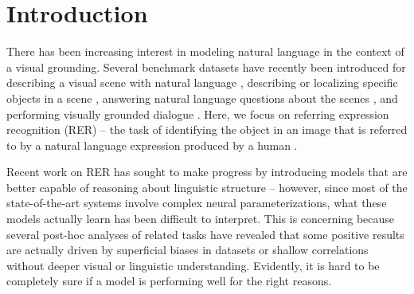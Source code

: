 \documentclass[11pt,a4paper]{article}
\begin{document}
\section{Introduction} 
\label{sec:introduction}
There has been increasing interest in modeling natural language in the context of a visual grounding. Several benchmark datasets have recently been introduced for describing a visual scene with natural language \cite{chen2015microsoft}, describing or localizing specific objects in a scene \cite{KazemzadehOrdonezMattenBergEMNLP14,mao2016generation}, answering natural language questions about the scenes \cite{antol2015vqa}, and performing visually grounded dialogue \cite{das2016visual}. Here, we focus on referring expression recognition (RER) -- the task of identifying the object in an image that is referred to by a natural language expression produced by a human \cite{KazemzadehOrdonezMattenBergEMNLP14,mao2016generation,hu2016natural,rohrbach2016grounding,yu2016modeling,nagaraja16refexp,hu2017modeling,cirik2018using}.

Recent work on RER has sought to make progress by introducing models that are better capable of reasoning about linguistic structure \cite{hu2017modeling,nagaraja16refexp} -- however, since most of the state-of-the-art systems involve complex neural parameterizations, what these models actually learn has been difficult to interpret.
This is concerning because several post-hoc analyses of related tasks \cite{zhou2015simple,devlin2015exploring,agrawal2016analyzing,jabri2016revisiting,goyal2016making} have revealed that some positive results are actually driven by superficial biases in datasets or shallow correlations without deeper visual or linguistic understanding. 
Evidently, it is hard to be completely sure if a model is performing well for the right reasons.
\end{document}
